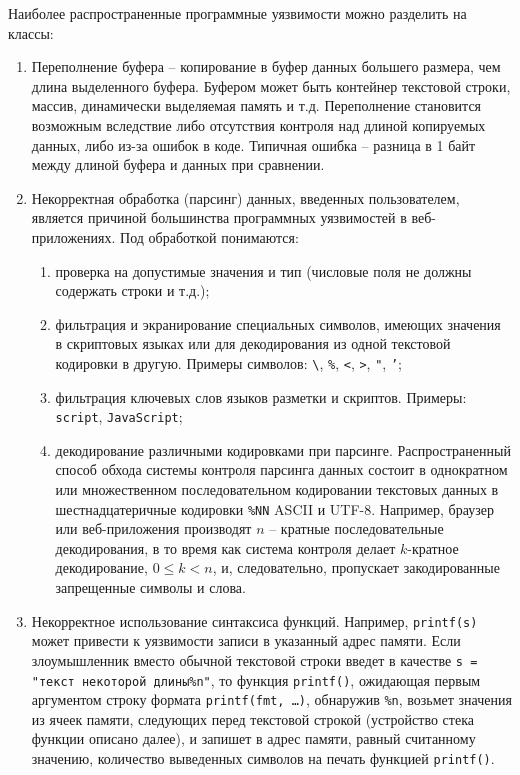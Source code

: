 \documentclass[10pt,a4paper]{book}
\begin{document}
Наиболее распространенные программные уязвимости можно разделить на классы:
\begin{enumerate}
    \item Переполнение буфера -- копирование в буфер данных большего размера, чем длина выделенного буфера. Буфером может быть контейнер текстовой строки, массив, динамически выделяемая память и т.д. Переполнение становится возможным вследствие либо отсутствия контроля над длиной копируемых данных, либо из-за ошибок в коде. Типичная ошибка -- разница в 1 байт между длиной буфера и данных при сравнении.
    \item Некорректная обработка (парсинг) данных, введенных пользователем, является причиной большинства программных уязвимостей в веб-приложениях. Под обработкой понимаются:
        \begin{enumerate}
            \item проверка на допустимые значения и тип (числовые поля не должны содержать строки и т.д.);
            \item фильтрация и экранирование специальных символов, имеющих значения в скриптовых языках или для декодирования из одной текстовой кодировки в другую. Примеры символов: \texttt{\textbackslash},  \texttt{\%}, \texttt{<}, \texttt{>}, \texttt{"},  \texttt{'};
            \item фильтрация ключевых слов языков разметки и скриптов. Примеры: \texttt{script}, \texttt{JavaScript};
            \item декодирование различными кодировками при парсинге. Распространенный способ обхода системы контроля парсинга данных состоит в однократном или множественном последовательном кодировании текстовых данных в шестнадцатеричные кодировки \texttt{\%NN} ASCII и UTF-8. Например, браузер или веб-приложения производят $n$ -- кратные последовательные декодирования, в то время как система контроля делает $k$-кратное декодирование, $0 \leq k < n$, и, следовательно, пропускает закодированные запрещенные символы и слова.
        \end{enumerate}
    \item Некорректное использование синтаксиса функций. Например, \texttt{printf(s)} может привести к уязвимости записи в указанный адрес памяти. Если злоумышленник вместо обычной текстовой строки введет в качестве \texttt{s = "текст некоторой длины\%n"}, то функция \texttt{printf()}, ожидающая первым аргументом строку формата \texttt{printf(fmt, \dots)}, обнаружив \texttt{\%n}, возьмет значения из ячеек памяти, следующих перед текстовой строкой (устройство стека функции описано далее), и запишет в адрес памяти, равный считанному значению, количество выведенных символов на печать функцией \texttt{printf()}.
\end{enumerate}
\end{document}
